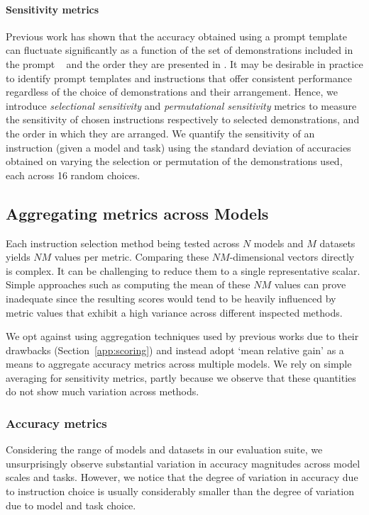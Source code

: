 \paragraph{Sensitivity metrics} Previous work has shown that the accuracy obtained using a prompt template can fluctuate significantly as a function of the set of demonstrations included in the prompt ~\cite{Liu2021WhatMG, Su2022SelectiveAM, rubin2022learning, Wang2023LargeLM} and the order they are presented in \cite{fantasticallyorderedprompts}. It may be desirable in practice to identify prompt templates and instructions that offer consistent performance regardless of the choice of demonstrations and their arrangement. Hence, we introduce \textit{selectional sensitivity} and \textit{permutational sensitivity} metrics to measure the sensitivity of chosen instructions respectively to selected demonstrations, and the order in which they are arranged. We quantify the sensitivity of an instruction (given a model and task) using the standard deviation of accuracies obtained on varying  the selection or permutation of the demonstrations used, each across 16 random choices.

\subsection{Aggregating metrics across Models}

Each instruction selection method being tested across $N$ models and $M$ datasets yields $NM$ values per metric. Comparing these $NM$-dimensional vectors directly is complex. It can be challenging to reduce them to a single representative scalar. Simple approaches such as computing the mean of these $NM$ values can prove inadequate since the resulting scores would tend to be heavily influenced by metric values that exhibit a high variance across different inspected methods. 

We opt against using aggregation techniques used by previous works \cite{helm, bigbench} due to their drawbacks (Section~\ref{app:scoring}) and instead adopt `mean relative gain' as a means to aggregate accuracy metrics across multiple models. We rely on simple averaging for sensitivity metrics, partly because we observe that these quantities do not show much variation across methods.

\subsubsection{Accuracy metrics}
Considering the range of models and datasets in our evaluation suite, we unsurprisingly observe substantial variation in accuracy magnitudes across model scales and tasks. However, we notice that the degree of variation in accuracy due to instruction choice is usually considerably smaller than the degree of variation due to model and task choice.


